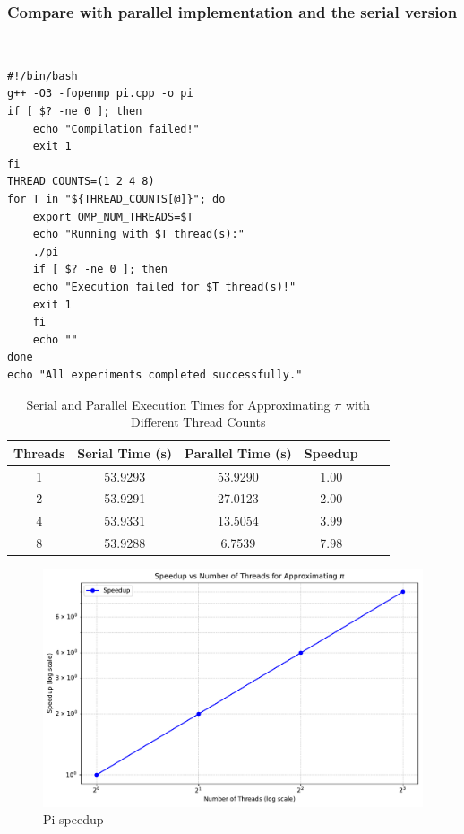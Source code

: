 \documentclass[unicode,11pt,a4paper,oneside,numbers=endperiod,openany]{scrartcl}
\begin{document}
\subsubsection{Compare with parallel implementation and the serial version}\
\begin{lstlisting}[language=MyBash, style=mystyle, caption={Bash Script for Running Pi Program with OpenMP Support}]
#!/bin/bash
g++ -O3 -fopenmp pi.cpp -o pi
if [ $? -ne 0 ]; then
    echo "Compilation failed!"
    exit 1
fi
THREAD_COUNTS=(1 2 4 8)
for T in "${THREAD_COUNTS[@]}"; do
    export OMP_NUM_THREADS=$T
    echo "Running with $T thread(s):"
    ./pi
    if [ $? -ne 0 ]; then
    echo "Execution failed for $T thread(s)!"
    exit 1
    fi
    echo ""
done
echo "All experiments completed successfully."
\end{lstlisting}
    
\begin{table}[ht]
    \centering
    \caption{Serial and Parallel Execution Times for Approximating \( \pi \) with Different Thread Counts}
    \begin{tabular}{@{}cccccc@{}}
        \toprule
        \textbf{Threads} & \textbf{Serial Time (s)} & \textbf{Parallel Time (s)} & \textbf{Speedup} \\
        \midrule
        1 & 53.9293 & 53.9290 & 1.00 \\
        2 & 53.9291 & 27.0123 & 2.00 \\
        4 & 53.9331 & 13.5054 & 3.99 \\
        8 & 53.9288 & 6.7539  & 7.98 \\
        \bottomrule
    \end{tabular}
    \label{tab:pi_approximation_results}
\end{table}

\begin{figure}[h]
    \centering
    \includegraphics[width=1\textwidth]{pictures/pi_speedup_plot.pdf}
    \caption{Pi speedup}
\end{figure}
\end{document}
